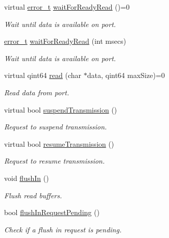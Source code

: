 \begin{DoxyCompactItemize}
virtual \hyperlink{classmdt_abstract_port_ad4121bb930c95887e77f8bafa065a85e}{error\-\_\-t} \hyperlink{classmdt_abstract_port_aeda364cb191da1038a22dd1fc06a1d49}{wait\-For\-Ready\-Read} ()=0
\begin{DoxyCompactList}\small\item\em Wait until data is available on port. \end{DoxyCompactList}\item 
\hyperlink{classmdt_abstract_port_ad4121bb930c95887e77f8bafa065a85e}{error\-\_\-t} \hyperlink{classmdt_abstract_port_a47f4db2e72b5fd3e32162e6a898fd391}{wait\-For\-Ready\-Read} (int msecs)
\begin{DoxyCompactList}\small\item\em Wait until data is available on port. \end{DoxyCompactList}\item 
virtual qint64 \hyperlink{classmdt_abstract_port_a9d9c45220d5328c9856a2445557fe970}{read} (char $\ast$data, qint64 max\-Size)=0
\begin{DoxyCompactList}\small\item\em Read data from port. \end{DoxyCompactList}\item 
virtual bool \hyperlink{classmdt_abstract_port_aff3d79248baf96e670eba6d2fef700b9}{suspend\-Transmission} ()
\begin{DoxyCompactList}\small\item\em Request to suspend transmission. \end{DoxyCompactList}\item 
virtual bool \hyperlink{classmdt_abstract_port_ad4a04c995df881593db0a309000be7a7}{resume\-Transmission} ()
\begin{DoxyCompactList}\small\item\em Request to resume transmission. \end{DoxyCompactList}\item 
void \hyperlink{classmdt_abstract_port_a32329b4188db796401e4f454755acb44}{flush\-In} ()
\begin{DoxyCompactList}\small\item\em Flush read buffers. \end{DoxyCompactList}\item 
bool \hyperlink{classmdt_abstract_port_a54b7bfb725c91b2c292a39275b877207}{flush\-In\-Request\-Pending} ()
\begin{DoxyCompactList}\small\item\em Check if a flush in request is pending. \end{DoxyCompactList}\item 

\end{DoxyCompactItemize}
